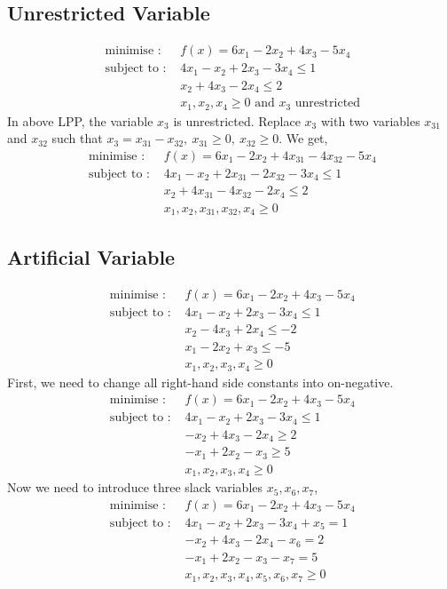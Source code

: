 \subsection{Unrestricted Variable}
\begin{align*}
\text{ minimise : } & f(x) = 6x_1 - 2x_2 +4x_3 - 5x_4\\
\text{ subject to : } & 4x_1 - x_2 + 2x_3 - 3x_4 \le 1 \\
& x_2 + 4x_3 - 2x_4 \le 2 \\
& x_1,x_2,x_4 \ge 0 \text{ and } x_3 \text{ unrestricted}
\end{align*}
	In above LPP, the variable $x_3$ is unrestricted. Replace $x_3$ with two variables $x_{31}$ and $x_{32}$ such that $x_3 = x_{31}-x_{32},\ x_{31} \ge 0,\ x_{32} \ge 0$. We get,
\begin{align*}
	\text{ minimise : } & f(x) = 6x_1 - 2x_2 +4x_{31}-4x_{32} - 5x_4\\
	\text{ subject to : } & 4x_1 - x_2 + 2x_{31}-2x_{32} - 3x_4 \le 1 \\
	& x_2 + 4x_{31}-4x_{32} - 2x_4 \le 2 \\
	& x_1,x_2,x_{31},x_{32},x_4 \ge 0
\end{align*}

\subsection{Artificial Variable}
\begin{align*}
\text{ minimise : } & f(x) = 6x_1 - 2x_2 +4x_3 - 5x_4\\
\text{ subject to : } & 4x_1 - x_2 + 2x_3 - 3x_4 \le 1 \\
& x_2 - 4x_3 + 2x_4 \le -2 \\
& x_1 - 2x_2 + x_3 \le -5 \\
& x_1,x_2,x_3,x_4 \ge 0
\end{align*}
First, we need to change all right-hand side constants into on-negative.
\begin{align*}
\text{ minimise : } & f(x) = 6x_1 - 2x_2 +4x_3 - 5x_4\\
\text{ subject to : } & 4x_1 - x_2 + 2x_3 - 3x_4 \le 1 \\
& -x_2 + 4x_3 - 2x_4 \ge 2 \\
& -x_1 + 2x_2 - x_3 \ge 5 \\
& x_1,x_2,x_3,x_4 \ge 0
\end{align*}
Now we need to introduce three slack variables $x_5,x_6,x_7$,
\begin{align*}
\text{ minimise : } & f(x) = 6x_1 - 2x_2 +4x_3 - 5x_4\\
\text{ subject to : } & 4x_1 - x_2 + 2x_3 - 3x_4 + x_5 = 1 \\
& -x_2 + 4x_3 - 2x_4 - x_6 = 2 \\
& -x_1 + 2x_2 - x_3 - x_7 = 5 \\
& x_1,x_2,x_3,x_4,x_5,x_6,x_7 \ge  0
\end{align*}

